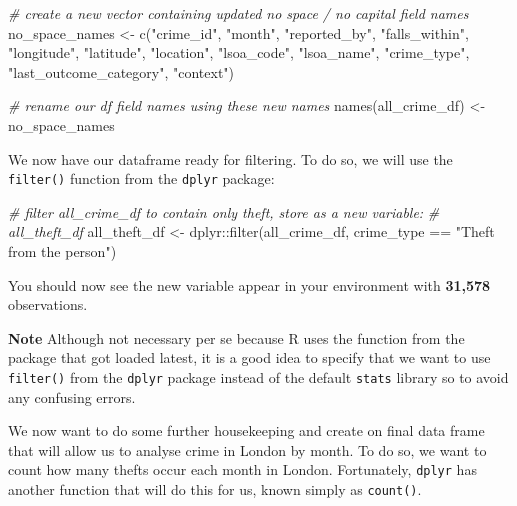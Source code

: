 \documentclass[
]{book}
\newenvironment{Shaded}{\begin{snugshade}}{\end{snugshade}}
\newcommand{\CommentTok}[1]{\textcolor[rgb]{0.56,0.35,0.01}{\textit{#1}}}
\newcommand{\FunctionTok}[1]{\textcolor[rgb]{0.00,0.00,0.00}{#1}}
\newcommand{\NormalTok}[1]{#1}
\newcommand{\OtherTok}[1]{\textcolor[rgb]{0.56,0.35,0.01}{#1}}
\newcommand{\SpecialCharTok}[1]{\textcolor[rgb]{0.00,0.00,0.00}{#1}}
\newcommand{\StringTok}[1]{\textcolor[rgb]{0.31,0.60,0.02}{#1}}
\begin{document}
\begin{Shaded}
\begin{Highlighting}[]
\CommentTok{\# create a new vector containing updated no space / no capital field names}
\NormalTok{no\_space\_names }\OtherTok{\textless{}{-}} \FunctionTok{c}\NormalTok{(}\StringTok{"crime\_id"}\NormalTok{, }\StringTok{"month"}\NormalTok{, }\StringTok{"reported\_by"}\NormalTok{, }\StringTok{"falls\_within"}\NormalTok{, }\StringTok{"longitude"}\NormalTok{,}
    \StringTok{"latitude"}\NormalTok{, }\StringTok{"location"}\NormalTok{, }\StringTok{"lsoa\_code"}\NormalTok{, }\StringTok{"lsoa\_name"}\NormalTok{, }\StringTok{"crime\_type"}\NormalTok{, }\StringTok{"last\_outcome\_category"}\NormalTok{,}
    \StringTok{"context"}\NormalTok{)}

\CommentTok{\# rename our df field names using these new names}
\FunctionTok{names}\NormalTok{(all\_crime\_df) }\OtherTok{\textless{}{-}}\NormalTok{ no\_space\_names}
\end{Highlighting}
\end{Shaded}

We now have our dataframe ready for filtering. To do so, we will use the \texttt{filter()} function from the \texttt{dplyr} package:

\begin{Shaded}
\begin{Highlighting}[]
\CommentTok{\# filter all\_crime\_df to contain only theft, store as a new variable:}
\CommentTok{\# all\_theft\_df}
\NormalTok{all\_theft\_df }\OtherTok{\textless{}{-}}\NormalTok{ dplyr}\SpecialCharTok{::}\FunctionTok{filter}\NormalTok{(all\_crime\_df, crime\_type }\SpecialCharTok{==} \StringTok{"Theft from the person"}\NormalTok{)}
\end{Highlighting}
\end{Shaded}

You should now see the new variable appear in your environment with \textbf{31,578} observations.

\textbf{Note}
Although not necessary per se because R uses the function from the package that got loaded latest, it is a good idea to specify that we want to use \texttt{filter()} from the \texttt{dplyr} package instead of the default \texttt{stats} library so to avoid any confusing errors.

We now want to do some further housekeeping and create on final data frame that will allow us to analyse crime in London by month. To do so, we want to count how many thefts occur each month in London. Fortunately, \texttt{dplyr} has another function that will do this for us, known simply as \texttt{count()}.
\end{document}
